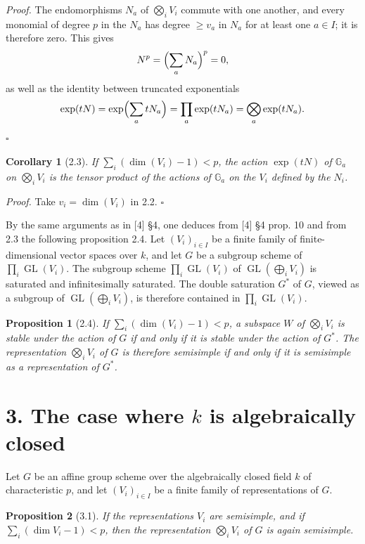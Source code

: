 \documentclass[10pt]{article}
\newcommand{\Ga}{\mathbb G_a}
\newcommand{\GL}{\operatorname{GL}}
\theoremstyle{deligne}
\newtheorem*{proposition*}{Proposition}
\newtheorem*{corollary*}{Corollary}
\newenvironment{proofdel}{\textit{Proof.}}{\hfill$\square$}
\begin{document}
\begin{proofdel}
The endomorphisms \(N_a\) of \(\bigotimes_i V_i\) commute with one another, and every monomial of degree \(p\) in the \(N_a\) has degree \(\ge v_a\) in \(N_a\) for at least one \(a\in I\); it is therefore zero. This gives
\[
N^p=\Bigl(\sum_a N_a\Bigr)^p=0,
\]
as well as the identity between truncated exponentials
\[
\exp(tN)=\exp\Bigl(\sum_a tN_a\Bigr)=\prod_a\exp(tN_a)=\bigotimes_a\exp(tN_a).
\]
\end{proofdel}

\begin{corollary*}[2.3]
If \(\sum_i(\dim(V_i)-1)<p\), the action \(\exp(tN)\) of \(\Ga\) on \(\bigotimes_i V_i\) is the tensor product of the actions of \(\Ga\) on the \(V_i\) defined by the \(N_i\).
\end{corollary*}

\begin{proofdel}
Take \(v_i=\dim(V_i)\) in 2.2.
\end{proofdel}

By the same arguments as in [4] \S4, one deduces from [4] \S4 prop. 10 and from 2.3 the following proposition 2.4. Let \((V_i)_{i\in I}\) be a finite family of finite-dimensional vector spaces over \(k\), and let \(G\) be a subgroup scheme of \(\prod_i\GL(V_i)\). The subgroup scheme \(\prod_i\GL(V_i)\) of \(\GL(\bigoplus_i V_i)\) is saturated and infinitesimally saturated. The double saturation \(G^*\) of \(G\), viewed as a subgroup of \(\GL(\bigoplus_iV_i)\), is therefore contained in \(\prod_i\GL(V_i)\).

\begin{proposition*}[2.4]
If \(\sum_i(\dim(V_i)-1)<p\), a subspace \(W\) of \(\bigotimes_i V_i\) is stable under the action of \(G\) if and only if it is stable under the action of \(G^*\). The representation \(\bigotimes_i V_i\) of \(G\) is therefore semisimple if and only if it is semisimple as a representation of \(G^*\).
\end{proposition*}

\section*{3. The case where \(k\) is algebraically closed}

Let \(G\) be an affine group scheme over the algebraically closed field \(k\) of characteristic \(p\), and let \((V_i)_{i\in I}\) be a finite family of representations of \(G\).

\begin{proposition*}[3.1]
If the representations \(V_i\) are semisimple, and if \(\sum_i(\dim V_i-1)<p\), then the representation \(\bigotimes_iV_i\) of \(G\) is again semisimple.
\end{proposition*}
\end{document}

